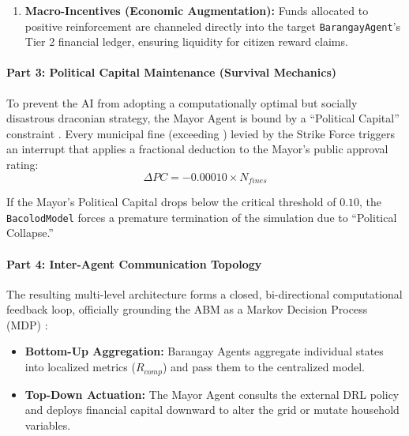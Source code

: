 \begin{enumerate}
    The Mayor dynamically instantiates these high-capacity \texttt{EnforcementAgents} (flagged as \texttt{is\_municipal = True}). They achieve a 100\% daily patrol rate, execute up to 25 apprehensions per tick, and issue severe ,000 citations \citep{Wang2023}. Crucially, these agents are bound by their strict 30-day limit enforced via computational object destruction. Upon reaching zero, the object invokes a self-destruct sequence (\texttt{self.model.grid.remove\_agent()}), physically deleting itself from the spatial grid. 
    
    \item \textbf{Macro-Incentives (Economic Augmentation):} Funds allocated to positive reinforcement are channeled directly into the target \texttt{BarangayAgent}'s Tier 2 financial ledger, ensuring liquidity for citizen reward claims.
\end{enumerate}

\paragraph{Part 3: Political Capital Maintenance (Survival Mechanics)}

To prevent the AI from adopting a computationally optimal but socially disastrous draconian strategy, the Mayor Agent is bound by a ``Political Capital'' constraint \citep{Hertweck2023}. Every municipal fine (exceeding ) levied by the Strike Force triggers an interrupt that applies a fractional deduction to the Mayor's public approval rating:
\begin{equation}
    \Delta PC = -0.00010 \times N_{fines}
    \label{eq:political_capital_decay}
\end{equation}

If the Mayor's Political Capital drops below the critical threshold of $0.10$, the \texttt{BacolodModel} forces a premature termination of the simulation due to ``Political Collapse.''

\paragraph{Part 4: Inter-Agent Communication Topology}

The resulting multi-level architecture forms a closed, bi-directional computational feedback loop, officially grounding the ABM as a Markov Decision Process (MDP) \citep{Kompella2020}:
\begin{itemize}
    \item \textbf{Bottom-Up Aggregation:} Barangay Agents aggregate individual states into localized metrics ($R_{comp}$) and pass them to the centralized model.
    \item \textbf{Top-Down Actuation:} The Mayor Agent consults the external DRL policy and deploys financial capital downward to alter the grid or mutate household variables.
\end{itemize}


